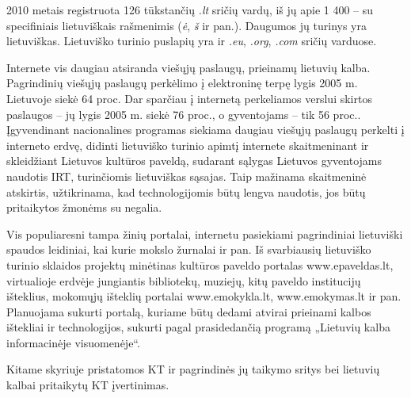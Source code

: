 \begin{multicols}{2}

2010 metais registruota 126 tūkstančių \textit{.lt} sričių vardų, iš jų apie 1 400 –  su specifiniais lietuviškais rašmenimis (\textit{ė}, \textit{š} ir pan.). Daugumos jų turinys yra lietuviškas. Lietuviško turinio puslapių yra ir \textit{.eu}, \textit{.org}, \textit{.com} sričių varduose.   

 Internete vis daugiau atsiranda viešųjų paslaugų, prieinamų lietuvių kalba. Pagrindinių viešųjų paslaugų perkėlimo į elektroninę terpę lygis 2005 m. Lietuvoje siekė 64 proc. Dar sparčiau į internetą perkeliamos verslui skirtos paslaugos – jų lygis 2005 m. siekė 76 proc., o gyventojams – tik 56 proc.\cite{esparama}.  Įgyvendinant nacionalines programas siekiama daugiau viešųjų paslaugų perkelti į interneto erdvę, didinti lietuviško turinio apimtį internete skaitmeninant ir skleidžiant Lietuvos kultūros paveldą, sudarant sąlygas Lietuvos gyventojams naudotis IRT, turinčiomis lietuviškas sąsajas. Taip mažinama skaitmeninė atskirtis, užtikrinama, kad technologijomis būtų lengva naudotis, jos būtų pritaikytos žmonėms su negalia.   


   Vis populiaresni tampa žinių portalai, internetu pasiekiami pagrindiniai lietuviški spaudos leidiniai, kai kurie mokslo žurnalai ir pan. Iš svarbiausių lietuviško turinio sklaidos projektų minėtinas kultūros paveldo portalas www.epaveldas.lt, virtualioje erdvėje jungiantis bibliotekų, muziejų, kitų paveldo institucijų išteklius, mokomųjų išteklių portalai www.emokykla.lt, www.emokymas.lt ir pan. Planuojama sukurti portalą, kuriame būtų dedami atvirai prieinami kalbos ištekliai ir technologijos, sukurti pagal prasidedančią programą „Lietuvių kalba informacinėje visuomenėje“.  

Kitame skyriuje pristatomos KT ir pagrindinės jų taikymo sritys bei lietuvių kalbai pritaikytų KT įvertinimas.

\end{multicols}

\clearpage


